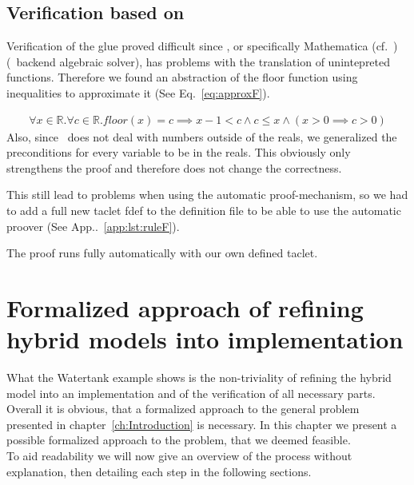 \section{Verification based on \keym}
\label{sec:Watertank:Verification}

Verification of the glue proved difficult since \keym, or specifically Mathematica (cf.~\cite{mathematica}) (\keym~backend algebraic solver), has problems with the translation of unintepreted functions. Therefore we found an abstraction of the floor function using inequalities to approximate it (See Eq.~\ref{eq:approxF}). 

\begin{align*}
		\forall x \in \mathbb{R}. \forall c \in \mathbb{R}. floor(x) = c \implies x-1 < c \wedge c \leq x \wedge( x>0\implies c>0)
	\label{eq:approxF}
\end{align*}
Also, since \keym~does not deal with numbers outside of the reals, we generalized the preconditions for every variable to be in the reals. This obviously only strengthens the proof and therefore does not change the correctness.

This still lead to problems when using the automatic proof-mechanism, so we had to add a full new taclet fdef to the definition file to be able to use the automatic proover (See App..~\ref{app:lst:ruleF}).

The proof runs fully automatically with our own defined taclet.

\chapter{Formalized approach of refining hybrid models into implementation}
\label{ch:Process}

What the Watertank example shows is the non-triviality of refining the hybrid model into an implementation and of the verification of all necessary parts. Overall it is obvious, that a formalized approach to the general problem presented in chapter~\ref{ch:Introduction} is necessary. In this chapter we present a possible formalized approach to the problem, that we deemed feasible.
\\


To aid readability we will now give an overview of the process without explanation, then detailing each step in the following sections. 

